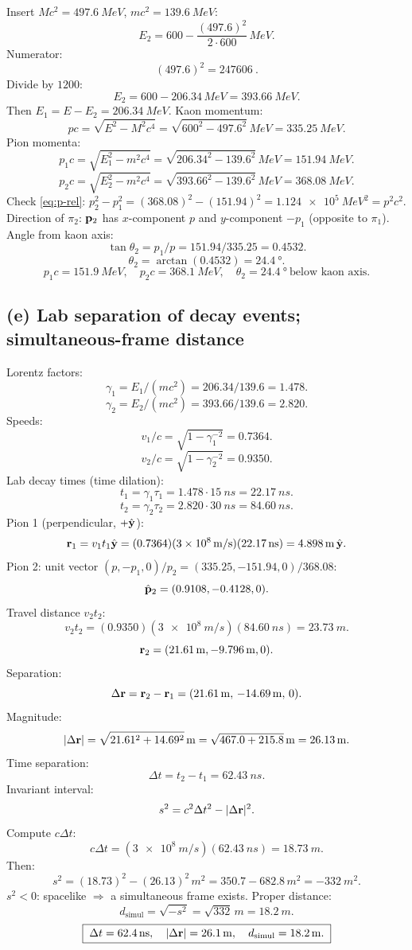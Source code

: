 \documentclass[11pt]{article}
\begin{document}
Insert $M c^2=\SI{497.6}{MeV}$, $mc^2=\SI{139.6}{MeV}$:
\[ E_2 = 600 - \frac{(497.6)^2}{2\cdot 600}\,\si{MeV}. \]
Numerator:
\[ (497.6)^2 = \SI{247606}{}. \]
Divide by $1200$:
\[ E_2 = 600 - 206.34\,\si{MeV} = \SI{393.66}{MeV}. \]
Then $E_1 = E-E_2 = \SI{206.34}{MeV}$.
Kaon momentum:
\[ pc = \sqrt{E^2-M^2c^4} = \sqrt{600^2-497.6^2}\,\si{MeV} = \SI{335.25}{MeV}. \]
Pion momenta:
\[ p_1 c = \sqrt{E_1^2-m^2c^4} = \sqrt{206.34^2-139.6^2}\,\si{MeV} = \SI{151.94}{MeV}. \]
\[ p_2 c = \sqrt{E_2^2-m^2c^4} = \sqrt{393.66^2-139.6^2}\,\si{MeV} = \SI{368.08}{MeV}. \]
Check \eqref{eq:p-rel}: $p_2^2-p_1^2=(368.08)^2-(151.94)^2=\SI{1.124e5}{MeV^2}=p^2 c^2$. \checkmark
Direction of $\pi_2$: $\vb p_2$ has $x$-component $p$ and $y$-component $-p_1$ (opposite to $\pi_1$). Angle from kaon axis:
\[ \tan\theta_2 = p_1/p = 151.94/335.25 = 0.4532. \]
\[ \theta_2 = \arctan(0.4532) = \SI{24.4}{\degree}. \]
\begin{equation}
\boxed{\;p_1 c=\SI{151.9}{MeV},\quad p_2 c=\SI{368.1}{MeV},\quad \theta_2=\SI{24.4}{\degree}\ \text{below kaon axis}.\;}
\end{equation}

\subsection*{(e) Lab separation of decay events; simultaneous-frame distance}

Lorentz factors:
\[ \gamma_1 = E_1/(mc^2) = 206.34/139.6 = 1.478. \]
\[ \gamma_2 = E_2/(mc^2) = 393.66/139.6 = 2.820. \]
Speeds:
\[ v_1/c = \sqrt{1-\gamma_1^{-2}} = 0.7364. \]
\[ v_2/c = \sqrt{1-\gamma_2^{-2}} = 0.9350. \]
Lab decay times (time dilation):
\[ t_1 = \gamma_1\tau_1 = 1.478\cdot\SI{15}{ns} = \SI{22.17}{ns}. \]
\[ t_2 = \gamma_2\tau_2 = 2.820\cdot\SI{30}{ns} = \SI{84.60}{ns}. \]
Pion 1 (perpendicular, $+\hat{\vb y}$):
\[ \vb r_1 = v_1 t_1\hat{\vb y} = (0.7364)(\SI{3e8}{m/s})(\SI{22.17}{ns}) = \SI{4.898}{m}\,\hat{\vb y}. \]
Pion 2: unit vector $(p,-p_1,0)/p_2 = (335.25,-151.94,0)/368.08$:
\[ \hat{\vb p}_2 = (0.9108,-0.4128,0). \]
Travel distance $v_2 t_2$:
\[ v_2 t_2 = (0.9350)(\SI{3e8}{m/s})(\SI{84.60}{ns}) = \SI{23.73}{m}. \]
\[ \vb r_2 = (\SI{21.61}{m},-\SI{9.796}{m},0). \]
Separation:
\[ \Delta\vb r = \vb r_2-\vb r_1 = (\SI{21.61}{m},\,-\SI{14.69}{m},\,0). \]
Magnitude:
\[ |\Delta\vb r| = \sqrt{21.61^2+14.69^2}\,\si{m} = \sqrt{467.0+215.8}\,\si{m} = \SI{26.13}{m}. \]
Time separation:
\[ \Delta t = t_2-t_1 = \SI{62.43}{ns}. \]
Invariant interval:
\[ s^2 = c^2\Delta t^2 - |\Delta\vb r|^2. \]
Compute $c\Delta t$:
\[ c\Delta t = (\SI{3e8}{m/s})(\SI{62.43}{ns}) = \SI{18.73}{m}. \]
Then:
\[ s^2 = (18.73)^2 - (26.13)^2\,\si{m^2} = 350.7 - 682.8\,\si{m^2} = -\SI{332}{m^2}. \]
$s^2<0$: spacelike $\Rightarrow$ a simultaneous frame exists. Proper distance:
\[ d_\text{simul} = \sqrt{-s^2} = \sqrt{332}\,\si{m} = \SI{18.2}{m}. \]
\begin{equation}
\boxed{\;\Delta t=\SI{62.4}{ns},\quad |\Delta\vb r|=\SI{26.1}{m},\quad d_\text{simul}=\SI{18.2}{m}.\;}
\end{equation}
\end{document}
